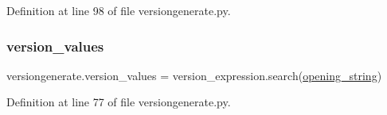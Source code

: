 Definition at line 98 of file versiongenerate.\+py.

\mbox{\label{namespaceversiongenerate_a0ce22d4ba772e519b000413a3bf5445c}} 
\subsubsection{\texorpdfstring{version\+\_\+values}{version\_values}}
{\footnotesize\ttfamily versiongenerate.\+version\+\_\+values = version\+\_\+expression.\+search(\hyperlink{namespaceversiongenerate_a88cc36d80d757546e04817490ebb0640}{opening\+\_\+string})}



Definition at line 77 of file versiongenerate.\+py.

